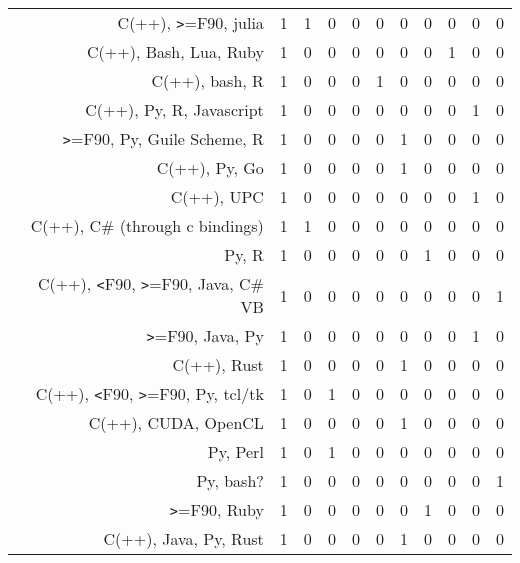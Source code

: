 {\begin{landscape}
\begin{longtable}[htb]{r|c|c|c|c|c|c|c|c|c|c}
{C(++), \verb!>!=F90, julia} & 1 & 1 & 0 & 0 & 0 & 0 & 0 & 0 & 0 & 0 \\%
{C(++), Bash, Lua, Ruby} & 1 & 0 & 0 & 0 & 0 & 0 & 0 & 1 & 0 & 0 \\%
{C(++), bash, R} & 1 & 0 & 0 & 0 & 1 & 0 & 0 & 0 & 0 & 0 \\%
{C(++), Py, R, Javascript} & 1 & 0 & 0 & 0 & 0 & 0 & 0 & 0 & 1 & 0 \\%
{\verb!>!=F90, Py, Guile Scheme, R} & 1 & 0 & 0 & 0 & 0 & 1 & 0 & 0 & 0 & 0 \\%
{C(++), Py, Go} & 1 & 0 & 0 & 0 & 0 & 1 & 0 & 0 & 0 & 0 \\%
{C(++), UPC} & 1 & 0 & 0 & 0 & 0 & 0 & 0 & 0 & 1 & 0 \\%
{C(++), C\# (through c bindings)} & 1 & 1 & 0 & 0 & 0 & 0 & 0 & 0 & 0 & 0 \\%
{Py, R} & 1 & 0 & 0 & 0 & 0 & 0 & 1 & 0 & 0 & 0 \\%
{C(++), \verb!<!F90, \verb!>!=F90, Java, C\# VB} & 1 & 0 & 0 & 0 & 0 & 0 & 0 & 0 & 0 & 1 \\%
{\verb!>!=F90, Java, Py} & 1 & 0 & 0 & 0 & 0 & 0 & 0 & 0 & 1 & 0 \\%
{C(++), Rust} & 1 & 0 & 0 & 0 & 0 & 1 & 0 & 0 & 0 & 0 \\%
{C(++), \verb!<!F90, \verb!>!=F90, Py, tcl/tk} & 1 & 0 & 1 & 0 & 0 & 0 & 0 & 0 & 0 & 0 \\%
{C(++), CUDA, OpenCL} & 1 & 0 & 0 & 0 & 0 & 1 & 0 & 0 & 0 & 0 \\%
{Py, Perl} & 1 & 0 & 1 & 0 & 0 & 0 & 0 & 0 & 0 & 0 \\%
{Py, bash?} & 1 & 0 & 0 & 0 & 0 & 0 & 0 & 0 & 0 & 1 \\%
{\verb!>!=F90, Ruby} & 1 & 0 & 0 & 0 & 0 & 0 & 1 & 0 & 0 & 0 \\%
{C(++), Java, Py, Rust} & 1 & 0 & 0 & 0 & 0 & 1 & 0 & 0 & 0 & 0 \\%
\hline%
\end{longtable}%
\end{landscape}}%
\clearpage%
